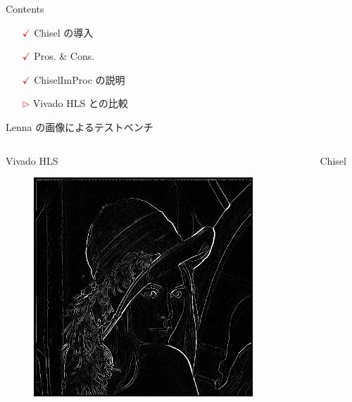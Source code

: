 \begin{frame}{Contents}
   \begin{itemize}
       \item[\textcolor{red}{$\checkmark$}] Chisel の導入
       \item[\textcolor{red}{$\checkmark$}] Pros. \& Cons.
       \item[\textcolor{red}{$\checkmark$}] ChiselImProc の説明
       \item[\textcolor{red}{$\rhd$}] Vivado HLS との比較
   \end{itemize} 
\end{frame}



\begin{frame}{Lenna の画像によるテストベンチ}
    \begin{columns}[t, onlytextwidth]
        \begin{column}{0.5\textwidth}
            Vivado HLS
            \begin{figure}
                \centering
                \includegraphics[width=0.9\textwidth]{./figures/out_hls.png}
            \end{figure}
        \end{column}
        \begin{column}{0.5\textwidth}
            Chisel
            \begin{figure}
                \centering

\end{figure}
\end{column}
\end{columns}
\end{frame}
